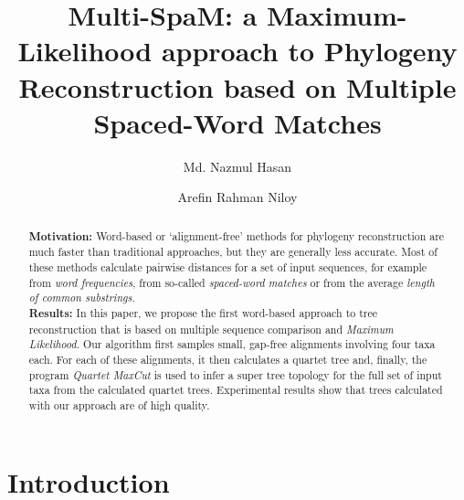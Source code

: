 \documentclass[review]{elsarticle}
\begin{document}
\begin{frontmatter}

\title{Multi-SpaM: a Maximum-Likelihood approach to Phylogeny Reconstruction based on Multiple Spaced-Word Matches}

\author{Md. Nazmul Hasan }

\author{Arefin Rahman Niloy}
\end{frontmatter}

\begin{abstract}
\textbf{Motivation:} 
Word-based or `alignment-free' methods for phylogeny
reconstruction are much faster
than traditional approaches, but they are generally less
accurate. Most of these methods calculate pairwise distances for a set
of input sequences, for example from {\em word frequencies}, from so-called {\em spaced-word matches} or from the average {\em length of common substrings}.
\\ 
\textbf{Results:}
In this paper, we propose the first word-based approach to tree reconstruction that is based on multiple sequence comparison and {\em Maximum Likelihood}.
Our algorithm first samples small, gap-free
alignments involving four taxa each. For each of these alignments,
it then calculates a quartet tree and, finally, the program {\em Quartet MaxCut} is used to infer a super tree topology for the full set of input
taxa from the calculated quartet trees. Experimental results show that trees
calculated with our approach are of high quality.
%

\end{abstract}


\section{Introduction}
\end{document}
